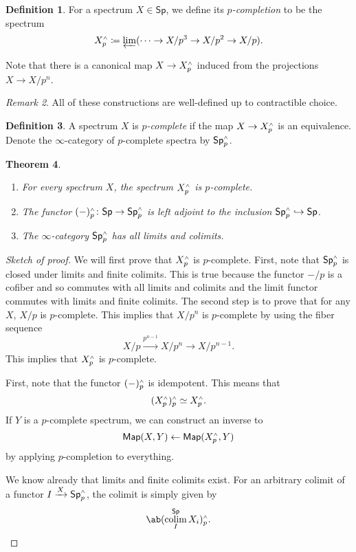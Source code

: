 \documentclass[10pt, oneside]{memoir}
\newtheorem{thm}{Theorem}[subsection]
\theoremstyle{definition}
\newtheorem{defn}[thm]{Definition}
\theoremstyle{remark}
\newtheorem{rmk}[thm]{Remark}
\theoremstyle{plain}
\theoremstyle{definition}
\theoremstyle{remark}
\newcommand{\ms}[1]{\mathsf{#1}}
\newcommand{\1}{\mathbf{1}}
\newcommand{\2}{\mathbf{2}}
\newcommand{\3}{\mathbf{3}}
\newcommand{\sw}{\mathsmaller{\wedge}}
\DeclareMathOperator*{\colim}{colim}
\begin{document}
\begin{defn}
    For a spectrum $X \in \ms{Sp}$, we define its \textit{$p$-completion} to be the spectrum
    \[ X_p^{\sw} \coloneqq \varprojlim (\cdots \to X/p^3 \to X/p^2 \to X/p). \]
\end{defn}
Note that there is a canonical map $X \to X_p^{\sw}$ induced from the projections $X \to X/p^n$.

\begin{rmk}
    All of these constructions are well-defined up to contractible choice.
\end{rmk}

\begin{defn}
    A spectrum $X$ is \textit{$p$-complete} if the map $X \to X_p^{\sw}$ is an equivalence. Denote the $\infty$-category of $p$-complete spectra by $\ms{Sp}_p^{\sw}$.
\end{defn}

\begin{thm}\leavevmode
    \begin{enumerate}
        \item For every spectrum $X$, the spectrum $X_p^{\sw}$ is $p$-complete.
        \item The functor $(-)_p^{\sw} \colon \ms{Sp} \to \ms{Sp}_p^{\sw}$ is left adjoint to the inclusion $\ms{Sp}_p^{\sw} \hookrightarrow \ms{Sp}$.
        \item The $\infty$-category $\ms{Sp}_p^{\sw}$ has all limits and colimits.
    \end{enumerate}
\end{thm}

\begin{proof}[Sketch of proof]
    We will first prove that $X_p^{\sw}$ is $p$-complete. First, note that $\ms{Sp}_p^{\sw}$ is closed under limits and finite colimits. This is true because the functor $-/p$ is a cofiber and so commutes with all limits and colimits and the limit functor commutes with limits and finite colimits. The second step is to prove that for any $X$, $X/p$ is $p$-complete. This implies that $X/p^n$ is $p$-complete by using the fiber sequence
    \[ X/p \xrightarrow{p^{n-1}} X/p^n \to X/p^{n-1}. \]
    This implies that $X_p^{\sw}$ is $p$-complete.

    First, note that the functor $(-)_p^{\sw}$ is idempotent. This means that
    \[ (X_p^{\sw})_p^{\sw} \simeq X_p^{\sw}. \]
    If $Y$ is a $p$-complete spectrum, we can construct an inverse to
    \[ \ms{Map}(X, Y) \gets \ms{Map}(X_p^{\sw}, Y) \]
    by applying $p$-completion to everything.

    We know already that limits and finite colimits exist. For an arbitrary colimit of a functor $I \xrightarrow{X} \ms{Sp}_p^{\sw}$, the colimit is simply given by
    \[ \ab(\colim_I^{\ms{Sp}} X_i)_p^{\sw}. \qedhere \]
\end{proof}
\end{document}
